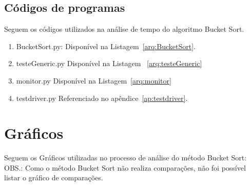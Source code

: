 \documentclass[12pt,a4paper,twoside]{report}
\begin{document}
\section{Códigos de programas}
Seguem os códigos utilizados na análise de tempo do algoritmo Bucket Sort.
\begin{enumerate}

\item BucketSort.py:
Disponível na Listagem~\ref{arq:BucketSort}.


\item testeGeneric.py
Disponível na Listagem ~\ref{arq:testeGeneric}


\item monitor.py
Disponível na Listagem~\ref{arq:monitor}



\item testdriver.py
 Referenciado no apêndice~\ref{ap:testdriver}.
\end{enumerate}


\chapter{Gráficos}

Seguem os Gráficos utilizadas no processo de análise do método Bucket Sort:
OBS.: Como o método Bucket Sort não realiza comparações, não foi possível listar o gráfico de comparações.
\end{document}
